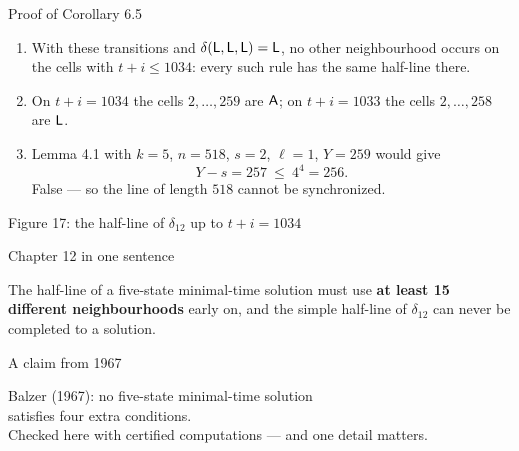 \begin{frame}{Proof of Corollary 6.5}
\begin{enumerate}
\item With these transitions and $\delta(\mathsf L,\mathsf L,\mathsf L)=\mathsf L$, no other neighbourhood occurs on the cells with $t+i\le1034$: every such rule has the same half-line there.
\item On $t+i=1034$ the cells $2,\dots,259$ are $\mathsf A$; on $t+i=1033$ the cells $2,\dots,258$ are $\mathsf L$.
\item Lemma 4.1 with $k=5$, $n=518$, $s=2$, $\ell=1$, $Y=259$ would give
\[Y-s=257\ \le\ 4^4=256 .\]
False --- so the line of length $518$ cannot be synchronized.
\end{enumerate}
\end{frame}

\begin{frame}{Figure 17: the half-line of $\delta_{12}$ up to $t+i=1034$}
\centering\fig[0.78]{}
\end{frame}

\begin{frame}{Chapter 12 in one sentence}
\vspace{4ex}
\begin{plainbox}\large
The half-line of a five-state minimal-time solution must use \textbf{at least 15 different neighbourhoods} early on, and the simple half-line of $\delta_{12}$ can never be completed to a solution.
\end{plainbox}
\end{frame}


\begin{frame}{A claim from 1967}
\vspace{5ex}
\begin{center}\Large
Balzer (1967): no five-state minimal-time solution\\ satisfies four extra conditions.\\[3ex]
\large Checked here with certified computations --- and one detail matters.
\end{center}
\end{frame}

